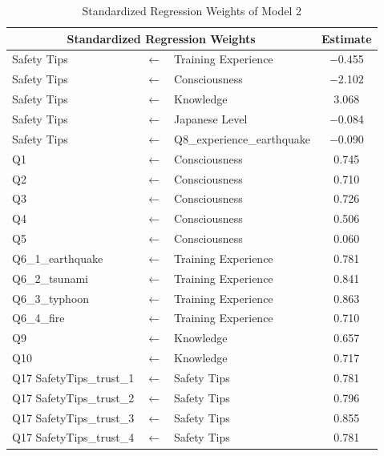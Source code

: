 \begin{table}[h]
  \caption{Standardized Regression Weights of Model 2 }
  \label{table12}
  \centering
  \begin{tabular}{|l|c|l|c|}
 \hline
 \multicolumn{3}{|c|}{Standardized Regression Weights} & Estimate \\
 \hline
  Safety Tips & $\longleftarrow$ & Training Experience & $-$0.455 \\
  Safety Tips & $\longleftarrow$ & Consciousness & $-$2.102 \\
  Safety Tips & $\longleftarrow$ & Knowledge & 3.068 \\
  Safety Tips & $\longleftarrow$ & Japanese Level & $-$0.084\\
  Safety Tips & $\longleftarrow$ & Q8\_experience\_earthquake & $-$0.090 \\
  Q1              & $\longleftarrow$ & Consciousness & 0.745 \\
  Q2              & $\longleftarrow$ & Consciousness & 0.710 \\
  Q3              & $\longleftarrow$ & Consciousness & 0.726 \\
  Q4              & $\longleftarrow$ & Consciousness & 0.506 \\
  Q5              & $\longleftarrow$ & Consciousness & 0.060 \\
  Q6\_1\_earthquake & $\longleftarrow$ & Training Experience & 0.781 \\
  Q6\_2\_tsunami & $\longleftarrow$ & Training Experience & 0.841 \\
  Q6\_3\_typhoon & $\longleftarrow$ & Training Experience & 0.863 \\
  Q6\_4\_fire & $\longleftarrow$ & Training Experience & 0.710 \\
  Q9             & $\longleftarrow$ & Knowledge & 0.657 \\
  Q10           & $\longleftarrow$ & Knowledge & 0.717 \\
  Q17 SafetyTips\_trust\_1 & $\longleftarrow$ & Safety Tips & 0.781 \\
  Q17 SafetyTips\_trust\_2 & $\longleftarrow$ & Safety Tips & 0.796 \\
  Q17 SafetyTips\_trust\_3 & $\longleftarrow$ & Safety Tips & 0.855 \\
  Q17 SafetyTips\_trust\_4 & $\longleftarrow$ & Safety Tips & 0.781 \\
 \hline
  \end{tabular}
\end{table}

